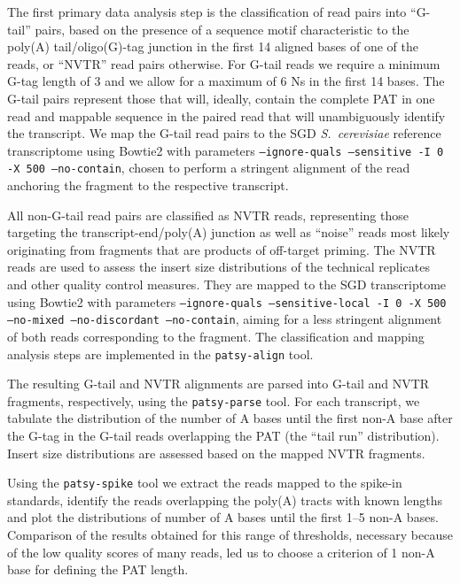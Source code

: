 \documentclass[10pt]{article}
\begin{document}
The first primary data analysis step is the classification of read pairs into ``G-tail'' pairs, based on the presence of a sequence motif characteristic to the poly(A) tail/oligo(G)-tag junction in the first 14 aligned bases of one of the reads, or ``NVTR'' read pairs otherwise. For G-tail reads we require a minimum G-tag length of 3 and we allow for a maximum of 6 Ns in the first 14 bases. The G-tail pairs represent those that will, ideally, contain the complete PAT in one read and mappable sequence in the paired read that will unambiguously identify the transcript. We map the G-tail read pairs to the SGD \textit{S.~cerevisiae} reference transcriptome \cite{engel13} using Bowtie2 \cite{langmead12} with parameters \texttt{--ignore-quals --sensitive -I~0 -X~500 --no-contain}, chosen to perform a stringent alignment of the read anchoring the fragment to the respective transcript. 

All non-G-tail read pairs are classified as NVTR reads, representing those targeting the transcript-end/poly(A) junction as well as ``noise'' reads most likely originating from fragments that are products of off-target priming. The NVTR reads 
are used to assess the insert size distributions of the technical replicates and other quality control measures. They are mapped to the SGD transcriptome using Bowtie2 with parameters \texttt{--ignore-quals --sensitive-local -I~0 -X~500 --no-mixed --no-discordant --no-contain}, aiming for a less stringent alignment of both reads corresponding to the fragment. The classification and mapping analysis steps are implemented in the \texttt{patsy-align} tool. 

The resulting G-tail and NVTR alignments are parsed into G-tail and NVTR fragments, respectively, using the \texttt{patsy-parse} tool. For each transcript, we tabulate the distribution of the number of A bases until the first non-A base after the G-tag in the G-tail reads overlapping the PAT (the ``tail run'' distribution). Insert size distributions are assessed based on the mapped NVTR fragments.

Using the \texttt{patsy-spike} tool we extract the reads mapped to the spike-in standards, identify the reads overlapping the poly(A) tracts with known lengths and plot the distributions of number of A bases until the first 1--5 non-A bases.  
Comparison of the results obtained for this range of thresholds, necessary because of the low quality scores of many reads, led us to choose a criterion of 1 non-A base for defining the PAT length.
\end{document}
